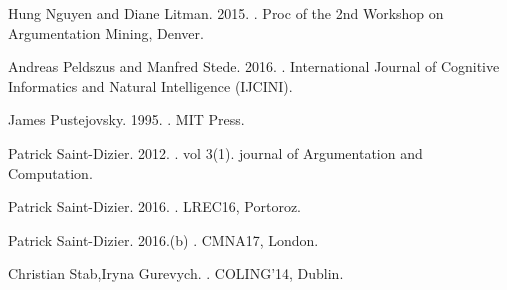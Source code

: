 \documentclass[11pt,letterpaper]{article}
\begin{document}
\begin{thebibliography}{}
Hung Nguyen and Diane Litman. 2015. 
.
\newblock  Proc of the 2nd Workshop on Argumentation Mining, Denver.

Andreas Peldszus and Manfred Stede. 2016.
.
\newblock International  Journal  of  Cognitive  Informatics  and  Natural
Intelligence (IJCINI).

James  Pustejovsky. 1995. 
.
\newblock MIT Press.

Patrick Saint-Dizier. 2012. 
. vol 3(1).
\newblock  journal of Argumentation and Computation. 

Patrick Saint-Dizier. 2016. 
.
\newblock LREC16, Portoroz.

Patrick Saint-Dizier. 2016.(b) 
.
\newblock CMNA17, London.

Christian Stab,Iryna Gurevych.
.
\newblock COLING'14, Dublin.



\end{thebibliography}

% 
\end{document}

